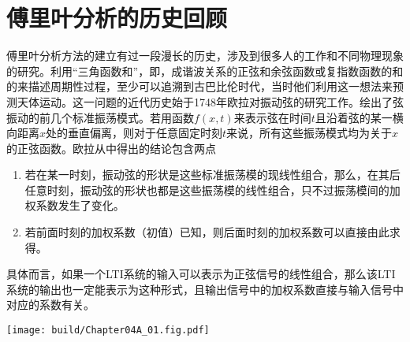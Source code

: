 \section{傅里叶分析的历史回顾}

傅里叶分析方法的建立有过一段漫长的历史，涉及到很多人的工作和不同物理现象的研究。利用“三角函数和”，即，成谐波关系的正弦和余弦函数或复指数函数的和的来描述周期性过程，至少可以追溯到古巴比伦时代，当时他们利用这一想法来预测天体运动。这一问题的近代历史始于1748年欧拉对振动弦的研究工作。绘出了弦振动的前几个标准振荡模式。若用函数$f(x,t)$来表示弦在时间$t$且沿着弦的某一横向距离$x$处的垂直偏离，则对于任意固定时刻$t$来说，所有这些振荡模式均为关于$x$的正弦函数。欧拉从中得出的结论包含两点
\begin{enumerate}
    \item 若在某一时刻，振动弦的形状是这些标准振荡模的现线性组合，那么，在其后任意时刻，振动弦的形状也都是这些振荡模的线性组合，只不过振荡模间的加权系数发生了变化。
    \item 若前面时刻的加权系数（初值）已知，则后面时刻的加权系数可以直接由此求得。
\end{enumerate}
具体而言，如果一个LTI系统的输入可以表示为正弦信号的线性组合，那么该LTI系统的输出也一定能表示为这种形式，且输出信号中的加权系数直接与输入信号中对应的系数有关。

\begin{Figure}[振动弦的标准振荡模]
    \texttt{[image: build/Chapter04A\_01.fig.pdf]}\hspace{1.5cm}
\end{Figure}

